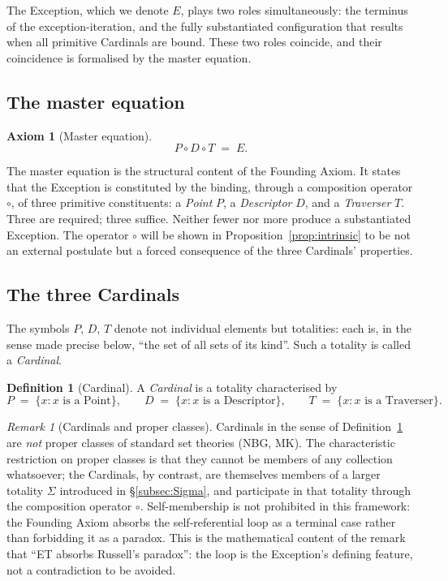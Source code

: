 \documentclass[11pt,a4paper]{article}
\theoremstyle{definition}
\newtheorem{definition}[theorem]{Definition}
\newtheorem{axiom}[theorem]{Axiom}
\theoremstyle{remark}
\newtheorem{remark}[theorem]{Remark}
\begin{document}
The Exception, which we denote $E$, plays two roles simultaneously: the terminus of the exception-iteration, and the fully substantiated configuration that results when all primitive Cardinals are bound. These two roles coincide, and their coincidence is formalised by the master equation.

\subsection{The master equation}

\begin{axiom}[Master equation]\label{ax:master}
\[
\boxed{\;P \circ D \circ T \;=\; E.\;}
\]
\end{axiom}

The master equation is the structural content of the Founding Axiom. It states that the Exception is constituted by the binding, through a composition operator $\circ$, of three primitive constituents: a \emph{Point} $P$, a \emph{Descriptor} $D$, and a \emph{Traverser} $T$. Three are required; three suffice. Neither fewer nor more produce a substantiated Exception. The operator $\circ$ will be shown in Proposition~\ref{prop:intrinsic} to be not an external postulate but a forced consequence of the three Cardinals' properties.

\subsection{The three Cardinals}

The symbols $P$, $D$, $T$ denote not individual elements but totalities: each is, in the sense made precise below, ``the set of all sets of its kind''. Such a totality is called a \emph{Cardinal}.

\begin{definition}[Cardinal]\label{def:cardinal}
A \emph{Cardinal} is a totality characterised by
\[
P \;=\; \{x : x \text{ is a Point}\}, \qquad
D \;=\; \{x : x \text{ is a Descriptor}\}, \qquad
T \;=\; \{x : x \text{ is a Traverser}\}.
\]
\end{definition}

\begin{remark}[Cardinals and proper classes]\label{rem:propclass}
Cardinals in the sense of Definition~\ref{def:cardinal} are \emph{not} proper classes of standard set theories (NBG, MK). The characteristic restriction on proper classes is that they cannot be members of any collection whatsoever; the Cardinals, by contrast, are themselves members of a larger totality $\Sigma$ introduced in \S\ref{subsec:Sigma}, and participate in that totality through the composition operator $\circ$. Self-membership is not prohibited in this framework: the Founding Axiom absorbs the self-referential loop as a terminal case rather than forbidding it as a paradox. This is the mathematical content of the remark that ``ET absorbs Russell's paradox'': the loop is the Exception's defining feature, not a contradiction to be avoided.
\end{remark}
\end{document}

